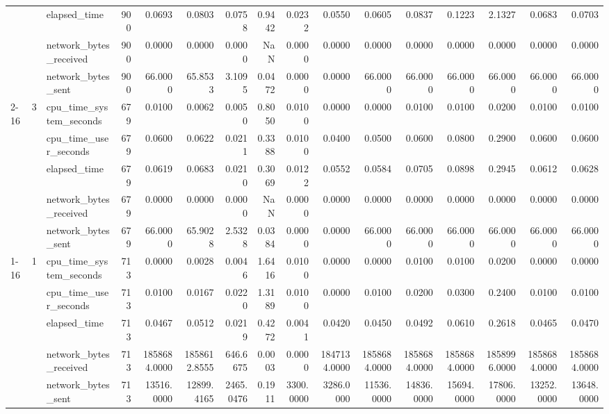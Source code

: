 \begin{tabular}{lllrrrrrrrrrrrrr}
 &  & elapsed\_time & 900 & 0.0693 & 0.0803 & 0.0758 & 0.9442 & 0.0232 & 0.0550 & 0.0605 & 0.0837 & 0.1223 & 2.1327 & 0.0683 & 0.0703 \\
 &  & network\_bytes\_received & 900 & 0.0000 & 0.0000 & 0.0000 & NaN & 0.0000 & 0.0000 & 0.0000 & 0.0000 & 0.0000 & 0.0000 & 0.0000 & 0.0000 \\
 &  & network\_bytes\_sent & 900 & 66.0000 & 65.8533 & 3.1095 & 0.0472 & 0.0000 & 0.0000 & 66.0000 & 66.0000 & 66.0000 & 66.0000 & 66.0000 & 66.0000 \\
\cline{2-16}
 & \multirow[t]{5}{*}{3} & cpu\_time\_system\_seconds & 679 & 0.0100 & 0.0062 & 0.0050 & 0.8050 & 0.0100 & 0.0000 & 0.0000 & 0.0100 & 0.0100 & 0.0200 & 0.0100 & 0.0100 \\
 &  & cpu\_time\_user\_seconds & 679 & 0.0600 & 0.0622 & 0.0211 & 0.3388 & 0.0100 & 0.0400 & 0.0500 & 0.0600 & 0.0800 & 0.2900 & 0.0600 & 0.0600 \\
 &  & elapsed\_time & 679 & 0.0619 & 0.0683 & 0.0210 & 0.3069 & 0.0122 & 0.0552 & 0.0584 & 0.0705 & 0.0898 & 0.2945 & 0.0612 & 0.0628 \\
 &  & network\_bytes\_received & 679 & 0.0000 & 0.0000 & 0.0000 & NaN & 0.0000 & 0.0000 & 0.0000 & 0.0000 & 0.0000 & 0.0000 & 0.0000 & 0.0000 \\
 &  & network\_bytes\_sent & 679 & 66.0000 & 65.9028 & 2.5328 & 0.0384 & 0.0000 & 0.0000 & 66.0000 & 66.0000 & 66.0000 & 66.0000 & 66.0000 & 66.0000 \\
\cline{1-16} \cline{2-16}
\multirow[t]{15}{*}{bbox-filtering-postgis-large} & \multirow[t]{5}{*}{1} & cpu\_time\_system\_seconds & 713 & 0.0000 & 0.0028 & 0.0046 & 1.6416 & 0.0100 & 0.0000 & 0.0000 & 0.0100 & 0.0100 & 0.0200 & 0.0000 & 0.0000 \\
 &  & cpu\_time\_user\_seconds & 713 & 0.0100 & 0.0167 & 0.0220 & 1.3189 & 0.0100 & 0.0000 & 0.0100 & 0.0200 & 0.0300 & 0.2400 & 0.0100 & 0.0100 \\
 &  & elapsed\_time & 713 & 0.0467 & 0.0512 & 0.0219 & 0.4272 & 0.0041 & 0.0420 & 0.0450 & 0.0492 & 0.0610 & 0.2618 & 0.0465 & 0.0470 \\
 &  & network\_bytes\_received & 713 & 1858684.0000 & 1858612.8555 & 646.6675 & 0.0003 & 0.0000 & 1847134.0000 & 1858684.0000 & 1858684.0000 & 1858684.0000 & 1858996.0000 & 1858684.0000 & 1858684.0000 \\
 &  & network\_bytes\_sent & 713 & 13516.0000 & 12899.4165 & 2465.0476 & 0.1911 & 3300.0000 & 3286.0000 & 11536.0000 & 14836.0000 & 15694.0000 & 17806.0000 & 13252.0000 & 13648.0000 \\

\end{tabular}
